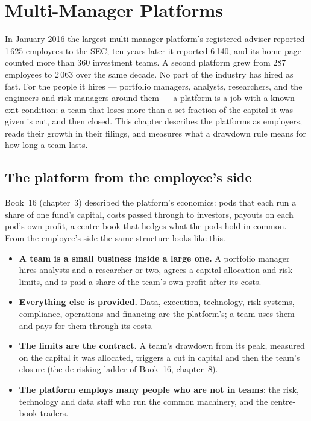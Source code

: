 \chapter{Multi-Manager Platforms}\label{ch:in:multi-manager-platforms}

In January 2016 the largest multi-manager platform's registered adviser reported 1\,625 employees to the SEC; ten years
later it reported 6\,140, and its home page counted more than 360 investment teams. A second platform grew from 287
employees to 2\,063 over the same decade. No part of the industry has hired as fast. For the people it hires --- portfolio
managers, analysts, researchers, and the engineers and risk managers around them --- a platform is a job with a known
exit condition: a team that loses more than a set fraction of the capital it was given is cut, and then closed. This
chapter describes the platforms as employers, reads their growth in their filings, and measures what a drawdown rule
means for how long a team lasts.

\section{The platform from the employee's side}

Book~16 (chapter~3) described the platform's economics: pods that each run a share of one fund's capital, costs passed
through to investors, payouts on each pod's own profit, a centre book that hedges what the pods hold in common. From
the employee's side the same structure looks like this.
\begin{itemize}
\item \textbf{A team is a small business inside a large one.} A portfolio manager hires analysts and a researcher or
two, agrees a capital allocation and risk limits, and is paid a share of the team's own profit after its costs.
\item \textbf{Everything else is provided.} Data, execution, technology, risk systems, compliance, operations and
financing are the platform's; a team uses them and pays for them through its costs.
\item \textbf{The limits are the contract.} A team's drawdown from its peak, measured on the capital it was allocated,
triggers a cut in capital and then the team's closure (the de-risking ladder of Book~16, chapter~8).
\item \textbf{The platform employs many people who are not in teams}: the risk, technology and data staff who run the
common machinery, and the centre-book traders.
\end{itemize}

